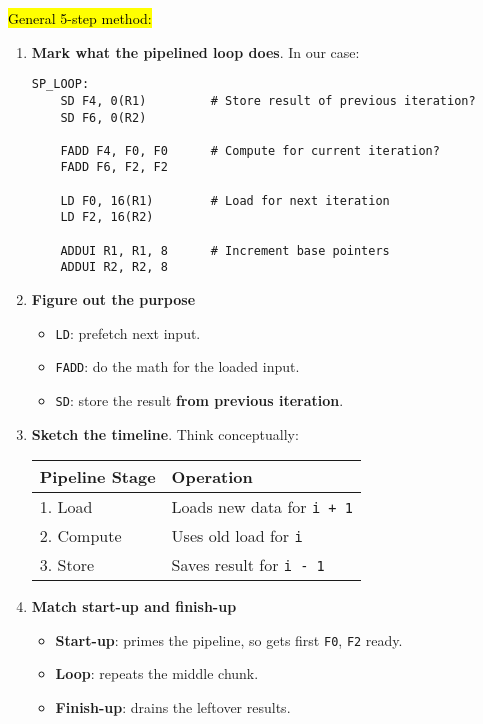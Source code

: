 \highspace
\hl{General 5-step method:}
\begin{enumerate}
    \item \textbf{Mark what the pipelined loop does}. In our case:
    \begin{lstlisting}
SP_LOOP:
    SD F4, 0(R1)         # Store result of previous iteration?
    SD F6, 0(R2)

    FADD F4, F0, F0      # Compute for current iteration?
    FADD F6, F2, F2

    LD F0, 16(R1)        # Load for next iteration
    LD F2, 16(R2)

    ADDUI R1, R1, 8      # Increment base pointers
    ADDUI R2, R2, 8\end{lstlisting}

    \item \textbf{Figure out the purpose}
    \begin{itemize}
        \item \texttt{LD}: prefetch next input.
        \item \texttt{FADD}: do the math for the loaded input.
        \item \texttt{SD}: store the result \textbf{from previous iteration}.
    \end{itemize}

    \newpage

    \item \textbf{Sketch the timeline}. Think conceptually:
    \begin{table}[!htp]
        \centering
        \begin{tabular}{@{} l l @{}}
            \toprule
            Pipeline Stage & Operation \\
            \midrule
            1. Load     & Loads new data for \texttt{i + 1} \\ [.5em]
            2. Compute  & Uses old load for \texttt{i}      \\ [.5em]
            3. Store    & Saves result for \texttt{i - 1}   \\
            \bottomrule
        \end{tabular}
    \end{table}

    \item \textbf{Match start-up and finish-up}
    \begin{itemize}
        \item \textbf{Start-up}: primes the pipeline, so gets first \texttt{F0}, \texttt{F2} ready.
        \item \textbf{Loop}: repeats the middle chunk.
        \item \textbf{Finish-up}: drains the leftover results.
    \end{itemize}


\end{enumerate}
